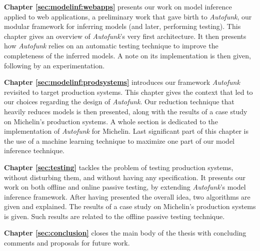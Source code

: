 \textbf{Chapter \ref{sec:modelinf:webapps}} presents our work on
model inference applied to web applications, a preliminary work
that gave birth to \textit{Autofunk}, our modular framework for
inferring models (and later, performing testing). This chapter
gives an overview of \textit{Autofunk}'s very first architecture. It then
presents how \textit{Autofunk} relies on an automatic testing technique to
improve the completeness of the inferred models. A note on its
implementation is then given, following by an experimentation.


\textbf{Chapter \ref{sec:modelinf:prodsystems}} introduces our
framework \textit{Autofunk} revisited to target production systems. This
chapter gives the context that led to our choices regarding the
design of \textit{Autofunk}. Our reduction technique that heavily reduces
models is then presented, along with the results of a case study
on Michelin's production systems. A whole section is dedicated to
the implementation of \textit{Autofunk} for Michelin. Last significant
part of this chapter is the use of a machine learning technique
to maximize one part of our model inference technique.

\textbf{Chapter \ref{sec:testing}} tackles the problem of testing
production systems, without disturbing them, and without having
any specification. It presents our work on both offline and
online passive testing, by extending \textit{Autofunk}'s model inference
framework. After having presented the overall idea, two algorithms
are given and explained. The results of a case study on
Michelin's production systems is given. Such results are related
to the offline passive testing technique.

\textbf{Chapter \ref{sec:conclusion}} closes the main body of the
thesis with concluding comments and proposals for future work.

\cleardoublepage
\blankpage
